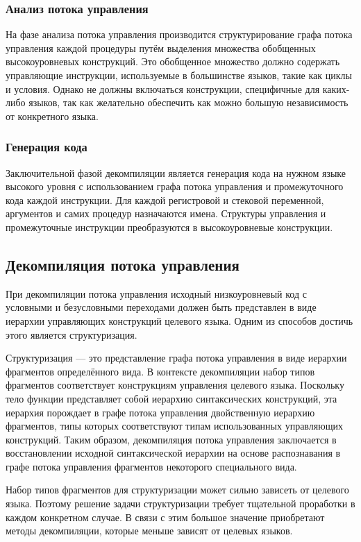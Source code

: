 \subsubsection*{Анализ потока управления} 
На фазе анализа потока управления производится структурирование графа потока управления каждой процедуры путём выделения множества обобщенных высокоуровневых конструкций. Это обобщенное множество должно содержать управляющие инструкции, используемые в большинстве языков, такие как циклы и условия. Однако не должны включаться конструкции, специфичные для каких-либо языков, так как желательно обеспечить как можно большую независимость от конкретного языка.
\subsubsection*{Генерация кода} 
Заключительной фазой декомпиляции является генерация кода на нужном языке высокого уровня с использованием графа потока управления и промежуточного кода каждой инструкции. Для каждой регистровой и стековой переменной, аргументов и самих процедур назначаются имена. Структуры управления и промежуточные инструкции преобразуются в высокоуровневые конструкции.


\subsection{Декомпиляция потока управления}

При декомпиляции потока управления исходный низкоуровневый код с условными и безусловными переходами должен быть представлен в виде иерархии управляющих конструкций целевого языка. Одним из способов достичь этого является структуризация.

Структуризация --- это представление графа потока управления в виде иерархии фрагментов определённого вида. В контексте декомпиляции набор типов фрагментов соответствует конструкциям управления целевого языка. Поскольку тело функции представляет собой иерархию синтаксических конструкций, эта иерархия порождает в графе потока управления двойственную иерархию фрагментов, типы которых соответствуют типам использованных управляющих конструкций. Таким образом, декомпиляция потока управления заключается в восстановлении исходной синтаксической иерархии на основе распознавания в графе потока управления фрагментов некоторого специального вида.

Набор типов фрагментов для структуризации может сильно зависеть от целевого языка. Поэтому решение задачи структуризации требует тщательной проработки в каждом конкретном случае. В связи с этим большое значение приобретают методы декомпиляции, которые меньше зависят от целевых языков. 

